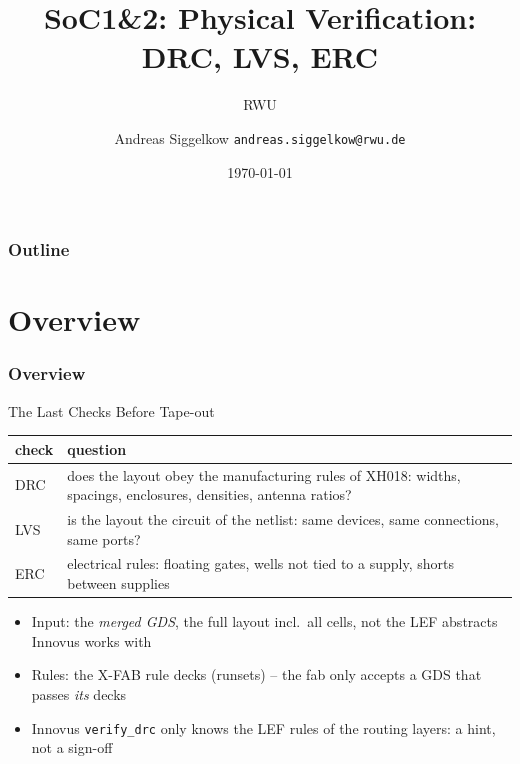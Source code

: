 \documentclass{beamer}
\title{SoC1\&2: Physical Verification: DRC, LVS, ERC}
\author[AS]{Andreas Siggelkow \newline \texttt{andreas.siggelkow@rwu.de}}
\date[2026]{\today}
\subtitle{RWU}
\institute{Elektrotechnik und Informatik}
\newcommand{\astitle}{nix}
\newcommand{\assubtitle}{nix}
\newcommand{\cmd}[1]{\texttt{#1}}
\begin{document}
\setcounter{tocdepth}{1}

\begin{frame}
  \titlepage
\end{frame}

\begin{frame}
  \frametitle{Outline}
  \tableofcontents
\end{frame}

\section{Overview}
\renewcommand{\astitle}{Overview}

\renewcommand{\assubtitle}{The Last Checks Before Tape-out}
\begin{frame}
\frametitle{\astitle}
\begin{block}{\assubtitle}
  \footnotesize
  \begin{tabularx}{\linewidth}{@{}lY@{}}
    \textbf{check} & \textbf{question}\\\hline
    DRC & does the layout obey the manufacturing rules of XH018: widths,
          spacings, enclosures, densities, antenna ratios?\\
    LVS & is the layout the circuit of the netlist: same devices, same
          connections, same ports?\\
    ERC & electrical rules: floating gates, wells not tied to a supply,
          shorts between supplies\\
  \end{tabularx}
  \vspace{4pt}
  \begin{itemize}
    \item Input: the \emph{merged GDS}, the full layout incl.\ all cells,
      not the LEF abstracts Innovus works with
    \item Rules: the X-FAB rule decks (runsets) -- the fab only accepts a
      GDS that passes \emph{its} decks
    \item Innovus \cmd{verify\_drc} only knows the LEF rules of the routing
      layers: a hint, not a sign-off
  \end{itemize}
\end{block}
\end{frame}
\end{document}
